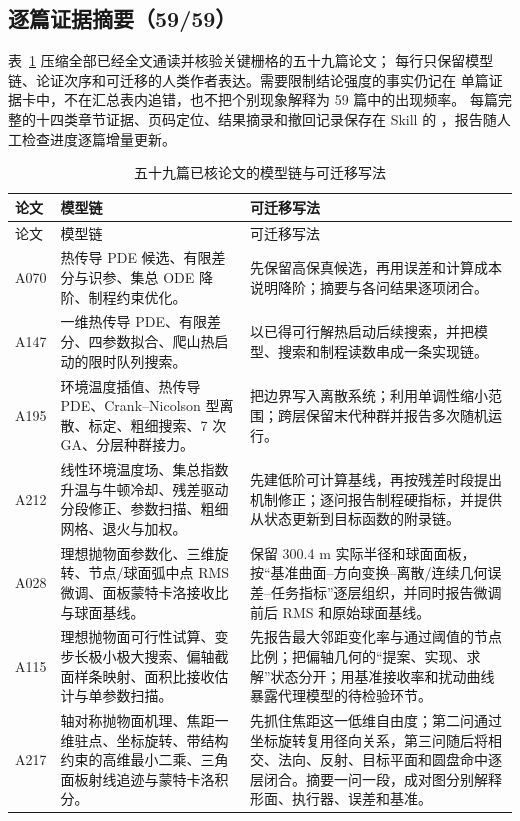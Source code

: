 \documentclass[UTF8,a4paper,12pt]{ctexart}
\begin{document}
\subsection{逐篇证据摘要（59/59）}

表~\ref{tab:verified-paper-cases} 压缩全部已经全文通读并核验关键栅格的五十九篇论文；
每行只保留模型链、论证次序和可迁移的人类作者表达。需要限制结论强度的事实仍记在
单篇证据卡中，不在汇总表内追错，也不把个别现象解释为 59 篇中的出现频率。
每篇完整的十四类章节证据、页码定位、结果摘录和撤回记录保存在 Skill 的
，报告随人工检查进度逐篇增量更新。

\begin{longtable}{p{1.4cm}p{5.2cm}p{7.0cm}}
\caption{五十九篇已核论文的模型链与可迁移写法}\label{tab:verified-paper-cases}\\
\toprule
论文 & 模型链 & 可迁移写法\\
\midrule
\endfirsthead
\toprule
论文 & 模型链 & 可迁移写法\\
\midrule
\endhead
A070 & 热传导 PDE 候选、有限差分与识参、集总 ODE 降阶、制程约束优化。 &
先保留高保真候选，再用误差和计算成本说明降阶；摘要与各问结果逐项闭合。\\
A147 & 一维热传导 PDE、有限差分、四参数拟合、爬山热启动的限时队列搜索。 &
以已得可行解热启动后续搜索，并把模型、搜索和制程读数串成一条实现链。\\
A195 & 环境温度插值、热传导 PDE、Crank--Nicolson 型离散、标定、粗细搜索、7 次 GA、分层种群接力。 &
把边界写入离散系统；利用单调性缩小范围；跨层保留末代种群并报告多次随机运行。\\
A212 & 线性环境温度场、集总指数升温与牛顿冷却、残差驱动分段修正、参数扫描、粗细网格、退火与加权。 &
先建低阶可计算基线，再按残差时段提出机制修正；逐问报告制程硬指标，并提供从状态更新到目标函数的附录链。\\
A028 & 理想抛物面参数化、三维旋转、节点/球面弧中点 RMS 微调、面板蒙特卡洛接收比与球面基线。 &
保留 300.4 m 实际半径和球面面板，按“基准曲面--方向变换--离散/连续几何误差--任务指标”逐层组织，并同时报告微调前后 RMS 和原始球面基线。\\
A115 & 理想抛物面可行性试算、变步长极小极大搜索、偏轴截面样条映射、面积比接收估计与单参数扫描。 &
先报告最大邻距变化率与通过阈值的节点比例；把偏轴几何的“提案、实现、求解”状态分开；用基准接收率和扰动曲线暴露代理模型的待检验环节。\\
A217 & 轴对称抛物面机理、焦距一维驻点、坐标旋转、带结构约束的高维最小二乘、三角面板射线追迹与蒙特卡洛积分。 &
先抓住焦距这一低维自由度；第二问通过坐标旋转复用径向关系，第三问随后将相交、法向、反射、目标平面和圆盘命中逐层闭合。摘要一问一段，成对图分别解释形面、执行器、误差和基准。\\

\end{longtable}
\end{document}
